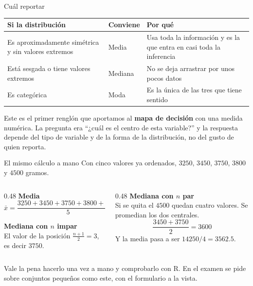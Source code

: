 \documentclass[aspectratio=169,10pt]{beamer}
\newcommand{\destaca}[1]{%
  \par\vspace{3pt}\noindent
  \colorbox{azulClaro}{%
    \parbox{\dimexpr\linewidth-2\fboxsep\relax}{\vspace{3pt}#1\vspace{3pt}}}%
  \par\vspace{3pt}}
\begin{document}
\begin{frame}{Cuál reportar}
  \begin{center}
  {\small
  \begin{tabular}{@{}p{5.2cm}p{3.2cm}p{4.4cm}@{}}
    \toprule
    \textbf{Si la distribución} & \textbf{Conviene} & \textbf{Por qué} \\
    \midrule
    Es aproximadamente simétrica y sin valores extremos & Media &
      Usa toda la información y es la que entra en casi toda la inferencia \\
    Está sesgada o tiene valores extremos & Mediana &
      No se deja arrastrar por unos pocos datos \\
    Es categórica & Moda &
      Es la única de las tres que tiene sentido \\
    \bottomrule
  \end{tabular}}
  \end{center}

  \vspace{0.4cm}
  \destaca{Este es el primer renglón que aportamos al \textbf{mapa de decisión} con una
  medida numérica. La pregunta era ``¿cuál es el centro de esta variable?'' y la
  respuesta depende del tipo de variable y de la forma de la distribución, no del gusto
  de quien reporta.}
\end{frame}
\begin{frame}{El mismo cálculo a mano}
  Con cinco valores ya ordenados, $3250$, $3450$, $3750$, $3800$ y $4500$ gramos.

  \vspace{0.3cm}
  \begin{columns}[T]
    \begin{column}{0.48\textwidth}
      \textbf{Media}\\[4pt]
      $\bar{x} = \dfrac{3250+3450+3750+3800+4500}{5} = \dfrac{18750}{5} = 3750$
      \vspace{0.3cm}

      \textbf{Mediana con $n$ impar}\\[4pt]
      El valor de la posición $\frac{n+1}{2} = 3$, es decir $3750$.
    \end{column}
    \begin{column}{0.48\textwidth}
      \textbf{Mediana con $n$ par}\\[4pt]
      Si se quita el $4500$ quedan cuatro valores. Se promedian los dos centrales.
      \[ \frac{3450+3750}{2} = 3600 \]
      Y la media pasa a ser $14250/4 = 3562.5$.
    \end{column}
  \end{columns}

  \vspace{0.4cm}
  \destaca{\small Vale la pena hacerlo una vez a mano y comprobarlo con R. En el examen
  se pide sobre conjuntos pequeños como este, con el formulario a la vista.}
\end{frame}
\end{document}
